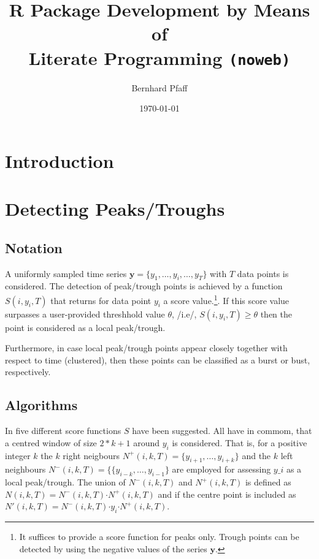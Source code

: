 \documentclass[a4paper]{article}
\begin{document}
\title{R Package Development by Means of \\
  Literate Programming \texttt{(noweb)}}
\author{Bernhard Pfaff}
\date{\today}

\maketitle

\section{Introduction}


\section{Detecting Peaks/Troughs}

\subsection{Notation}
A uniformly sampled time series $\mathbf{y} = \{y_1, \ldots, y_i,
\ldots, y_T\}$ with $T$ data points is considered. The detection of
peak/trough points is achieved by a function $S(i, y_i, T)$ that
returns for data point $y_i$ a score value.\footnote{It suffices to
  provide a score function for peaks only. Trough points can be
  detected by using the negative values of the series $\mathbf{y}$.}.
If this score value surpasses a user-provided threshhold value
$\theta$, /i.e/, $S(i, y_i, T) \ge \theta$ then the point is
considered as a local peak/trough.\par

Furthermore, in case local peak/trough points appear closely together
with respect to time (clustered), then these points can be classified
as a burst or bust, respectively.

\subsection{Algorithms}
In \citet{PAL2009} five different score functions $S$ have been
suggested. All have in commom, that a centred window of size $2*k +
1 $ around $y_i$ is considered. That is, for a positive integer $k$
the $k$ right neigbours $N^+(i,k, T) = \{y_{i+1}, \ldots, y_{i + k}\}$
and the $k$ left neighbours $N^-(i, k, T) = \{\{y_{i-k}, \ldots,
y_{i-1}\}$ are employed for assessing $y\_i$ as a local
peak/trough. The union of $N^-(i, k, T)$ and $N^+(i, k, T)$ is defined
as $N(i, k, T) = N^-(i, k, T) \mathord{\cdot} N^+(i, k, T)$ and if the
centre point is included as $N'(i, k, T) = N^-(i, k, T) \mathord{\cdot}
y_i \mathord{\cdot} N^+(i, k, T)$.\par
\end{document}
